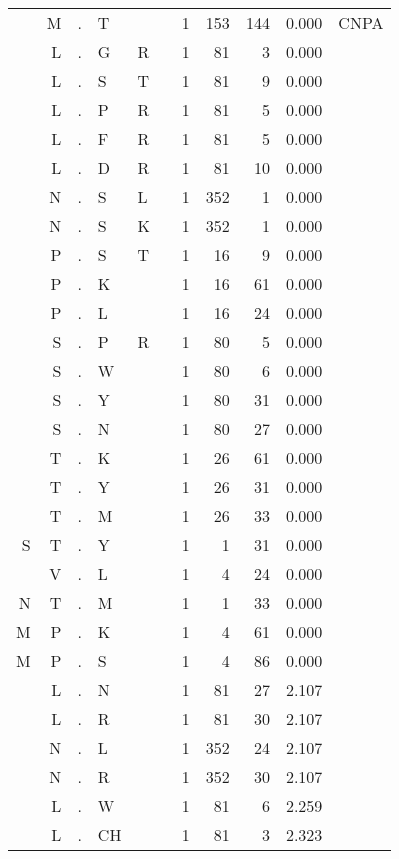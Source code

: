 \begin{longtable}{r@{ } r@{ } c@{ } l@{ } l@{ } l@{ } r r r r l }
  & M & . & T &   &   & 1 & 153 & 144 & 0.000 & \textsc{CNPA} \\
  & L & . & G & R &   & 1 & 81 & 3 & 0.000 &  \\
  & L & . & S & T &   & 1 & 81 & 9 & 0.000 &  \\
  & L & . & P & R &   & 1 & 81 & 5 & 0.000 &  \\
  & L & . & F & R &   & 1 & 81 & 5 & 0.000 &  \\
  & L & . & D & R &   & 1 & 81 & 10 & 0.000 &  \\
  & N & . & S & L &   & 1 & 352 & 1 & 0.000 &  \\
  & N & . & S & K &   & 1 & 352 & 1 & 0.000 &  \\
  & P & . & S & T &   & 1 & 16 & 9 & 0.000 &  \\
  & P & . & K &   &   & 1 & 16 & 61 & 0.000 &  \\
  & P & . & L &   &   & 1 & 16 & 24 & 0.000 &  \\
  & S & . & P & R &   & 1 & 80 & 5 & 0.000 &  \\
  & S & . & W &   &   & 1 & 80 & 6 & 0.000 &  \\
  & S & . & Y &   &   & 1 & 80 & 31 & 0.000 &  \\
  & S & . & N &   &   & 1 & 80 & 27 & 0.000 &  \\
  & T & . & K &   &   & 1 & 26 & 61 & 0.000 &  \\
  & T & . & Y &   &   & 1 & 26 & 31 & 0.000 &  \\
  & T & . & M &   &   & 1 & 26 & 33 & 0.000 &  \\
S & T & . & Y &   &   & 1 & 1 & 31 & 0.000 &  \\
  & V & . & L &   &   & 1 & 4 & 24 & 0.000 &  \\
N & T & . & M &   &   & 1 & 1 & 33 & 0.000 &  \\
M & P & . & K &   &   & 1 & 4 & 61 & 0.000 &  \\
M & P & . & S &   &   & 1 & 4 & 86 & 0.000 &  \\
  & L & . & N &   &   & 1 & 81 & 27 & 2.107 &  \\
  & L & . & R &   &   & 1 & 81 & 30 & 2.107 &  \\
  & N & . & L &   &   & 1 & 352 & 24 & 2.107 &  \\
  & N & . & R &   &   & 1 & 352 & 30 & 2.107 &  \\
  & L & . & W &   &   & 1 & 81 & 6 & 2.259 &  \\
  & L & . & CH &   &   & 1 & 81 & 3 & 2.323 &  \\

\end{longtable}

